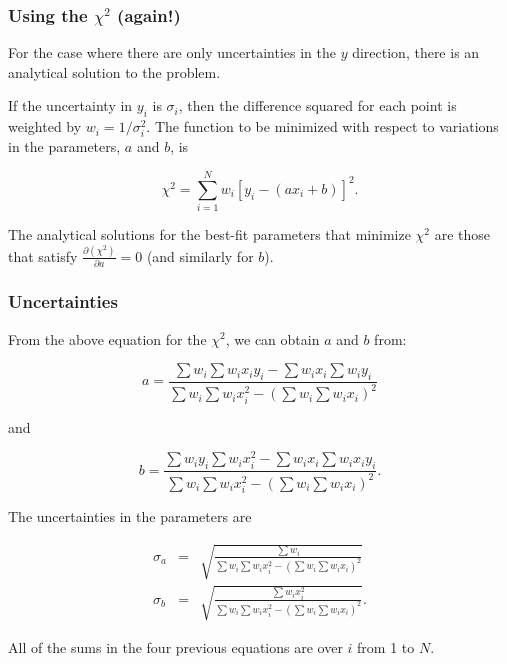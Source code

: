 \documentclass[hyperref={colorlinks=true}]{beamer}
\begin{document}
\begin{frame}%
  \frametitle{Using the $\chi^2$ (again!)}

  For the case where there are only uncertainties in the $y$ direction, there is an analytical solution to the problem.  
  
  \vspace{0.3cm}
  
  If the uncertainty in $y_i$ is $\sigma_i$, then the difference squared for each point is weighted by $w_i=1/\sigma_i^2$. The function to be minimized with respect to variations in the parameters, $a$ and $b$, is  

  \begin{equation}
    \chi^2 = \sum_{i=1}^N w_i \left[y_i - \left(ax_i+b\right)\right]^2.
  \end{equation}
    
The analytical solutions for the best-fit parameters that minimize $\chi^2$ are those that satisfy $\frac{\partial (\chi^2)}{\partial a}=0$ (and similarly for $b$).
  
\end{frame}



\begin{frame}%
  \frametitle{Uncertainties}

  From the above equation for the $\chi^2$, we can obtain $a$ and $b$ from:

  \begin{equation}
    a=\frac{\sum w_i \sum w_i x_i y_i - \sum w_i x_i \sum w_i y_i}{\sum w_i \sum w_i x_i^2 - \left(\sum w_i \sum w_i x_i\right)^2}
  \end{equation}

  and
  
  \begin{equation}
    b=\frac{\sum w_i y_i \sum w_i x_i^2 - \sum w_i x_i \sum w_i x_i y_i}{\sum w_i \sum w_i x_i^2 - \left(\sum w_i \sum w_i x_i\right)^2}.
  \end{equation}
  
  The uncertainties in the parameters are  

  \begin{eqnarray}
    \sigma_a &=& \sqrt{\frac{\sum w_i}{\sum w_i \sum w_i x_i^2 - \left(\sum w_i \sum w_i x_i\right)^2}} \\
    \sigma_b &=& \sqrt{\frac{\sum w_i x_i^2}{\sum w_i \sum w_i x_i^2 - \left(\sum w_i \sum w_i x_i\right)^2}}.
  \end{eqnarray}
  
All of the sums in the four previous equations are over $i$ from 1 to $N$.  
  
\end{frame}
\end{document}
